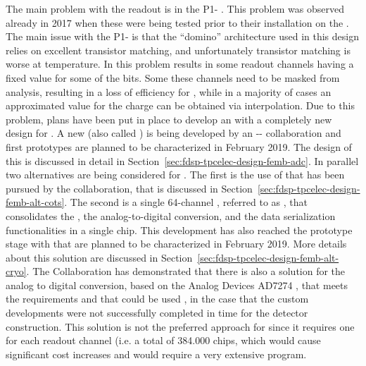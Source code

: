 The main problem with the   readout is in the
P1- . This problem was observed already in 2017
when these  were being tested prior to their installation
on the . The main issue with the P1- is 
that the ``domino'' architecture used in this design relies on
excellent transistor matching, and unfortunately transistor matching
is worse at  temperature. In  this problem
results in some readout channels having a fixed value for some of
the  bits. Some these channels need to be masked 
from analysis, resulting in a loss of efficiency for , while
in a majority of cases an approximated value for the charge can
be obtained via interpolation. Due to this problem, plans have
been put in place to develop an  with a completely new
design for . A new   (also called 
 ) is being developed by an 
-- collaboration and first
prototypes are planned to be characterized in February 2019. The design
of this  is discussed in detail in 
Section~\ref{sec:fdsp-tpcelec-design-femb-adc}. In parallel two
alternatives are being considered for . The first is the
use of   that has been pursued by the 
 collaboration, that is discussed in 
Section~\ref{sec:fdsp-tpcelec-design-femb-alt-cots}. The second is
a single \num{64}-channel , referred to as ,
that consolidates the , the analog-to-digital conversion, and the
data serialization functionalities in a single chip. This 
development has also reached the prototype stage with 
that are planned to be characterized in February 2019. More details about this
solution are discussed in Section~\ref{sec:fdsp-tpcelec-design-femb-alt-cryo}.
The  Collaboration has demonstrated that there is also
a  solution for the analog to digital conversion, based
on the Analog Devices AD7274 , that meets the 
requirements and that could be used , in the
case that the custom  developments were not successfully
completed in time for the detector construction. This 
solution is not the preferred approach for  since it
requires one  for each readout channel (i.e. a total
of \num{384,000} chips, which would cause significant cost increases
and would require a very extensive  program.

